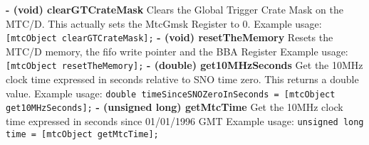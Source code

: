 \documentclass[12pt,preprint]{article}
\begin{document}
\textbf{- (void) clearGTCrateMask}
\newline\newline
Clears the Global Trigger Crate Mask on the MTC/D. This actually sets the MtcGmsk Register to 0.  
\newline\newline
Example usage:\newline
\texttt{[mtcObject clearGTCrateMask];}
\newline\newline
\textbf{- (void) resetTheMemory}
\newline\newline
Resets the MTC/D memory, the fifo write pointer and the BBA Register 
\newline\newline
Example usage:\newline
\texttt{[mtcObject resetTheMemory];}
\newline\newline
\textbf{- (double) get10MHzSeconds}
\newline\newline
Get the 10MHz clock time expressed in seconds relative to SNO time zero. This returns a double value. 
\newline\newline
Example usage:\newline
\texttt{double timeSinceSNOZeroInSeconds = [mtcObject  get10MHzSeconds];}
\newline\newline
\textbf{- (unsigned long) getMtcTime}
\newline\newline
Get the 10MHz clock time expressed in seconds since 01/01/1996 GMT
\newline\newline
Example usage:\newline
\texttt{unsigned long time = [mtcObject  getMtcTime];}
\newline\newline




\end{document}
